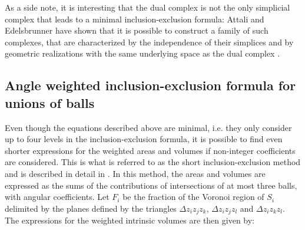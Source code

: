 \documentclass[11 pt]{article}
\theoremstyle{plain} \theorembodyfont{\rmfamily}
\begin{document}
As a side note, it is interesting that the dual complex is not the only simplicial complex
that leads to a minimal inclusion-exclusion formula: Attali and Edelsbrunner have shown that
it is possible to construct a family of such complexes, that are characterized by the independence
of their simplices and by geometric realizations with the same underlying space as the dual complex \cite{AtEd07}.

\subsection{Angle weighted inclusion-exclusion formula for unions of balls}

Even though the equations described above are minimal, i.e. they only consider up to four levels in the inclusion-exclusion formula, it is possible to find even shorter expressions for the weighted areas and volumes if non-integer coefficients are considered. This is what is referred to as the short inclusion-exclusion method and is described in detail in \cite{Ede95}.  In this method, the areas and volumes are expressed as the sums of the contributions of intersections of at most three balls, with angular coefficients.  Let $F_i$ be the fraction of the Voronoi region of $S_i$ delimited by the planes defined by the triangles $\Delta z_iz_jz_k$, $\Delta z_iz_jz_l$ and $\Delta z_iz_kz_l$. The expressions for the weighted intrinsic volumes are then given by:
\end{document}
